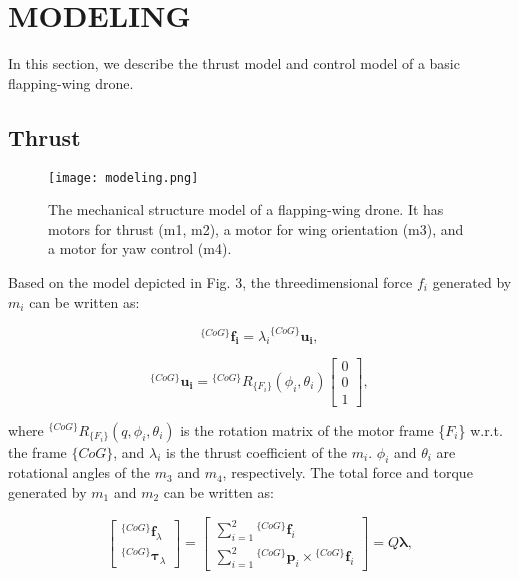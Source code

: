 \section{MODELING}

In this section, we describe the thrust model and control model of a basic flapping-wing drone.

\subsection{Thrust}

\begin{figure}[thpb]
    \centering
    \texttt{[image: modeling.png]}
    \caption{The mechanical structure model of a flapping-wing drone. It has motors for thrust (m1, m2), a motor for wing orientation (m3), and a motor for yaw control (m4).}
    \label{figure:label}
  \end{figure}
  

Based on the model depicted in Fig. 3, the threedimensional force $f_i$ generated by $m_i$ can be
written as:

\begin{equation}
    {}^{\{CoG\}}\bm{f_i} = {\lambda_i}^{\{CoG\}}\bm{u_i},
    \end{equation}
    
    \begin{equation}
    {}^{\{CoG\}}\bm{u_i} = {}^{\{CoG\}}R_{\{F_i\}}(\phi_i, \theta_i)
    \begin{bmatrix}
    0 \\
    0 \\
    1
    \end{bmatrix},
    \end{equation}
    
    where ${}^{\{CoG\}}R_{\{F_i\}}(q, \phi_i, \theta_i)$ is the rotation matrix of the motor frame
   {\{$F_i$\}} w.r.t. the frame ${\{CoG\}}$, and $\lambda_i$ is the thrust coefficient of the $m_i$. 
   $\phi_i$ and $\theta_i$ are rotational angles of the $m_3$ and $m_4$, respectively.
   The total force and torque generated by $m_1$ and $m_2$ can be written as:
    
    \begin{equation}
    \begin{bmatrix}
    {}^{\{CoG\}}\bm{f}_\lambda \\
    {}^{\{CoG\}}\bm{\tau}_\lambda
    \end{bmatrix}
    =
    \begin{bmatrix}
    \sum_{i=1}^{2} {}^{\{CoG\}}\bm{f}_i \\
    \sum_{i=1}^{2} {}^{\{CoG\}}\bm{p}_i \times {}^{\{CoG\}}\bm{f}_i
    \end{bmatrix}
    = Q\bm{\lambda},
    \end{equation}
    
